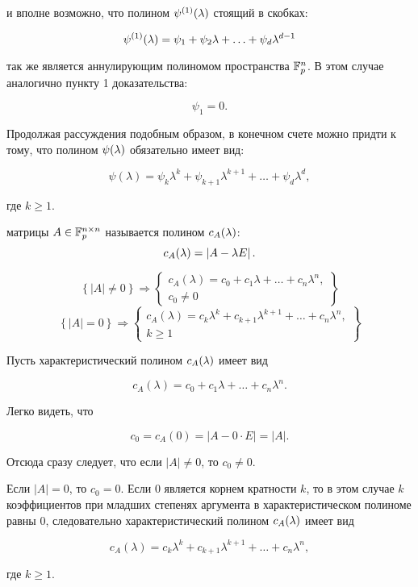 \begin{statement}
\begin{enumerate}
			и вполне возможно, что полином $\psi^{(1)} (\lambda)$ стоящий в скобках:

				$$ \psi^{(1)} (\lambda) = \psi_1 + \psi_2\lambda + \ldots + \psi_d\lambda^{d-1} $$

			так же является аннулирующим полиномом пространства $\mathbb{F}^{n}_p$. В этом случае аналогично пункту 1 доказательства:

				$$ \psi_1 = 0. $$

			Продолжая рассуждения подобным образом, в конечном счете можно придти к тому, что полином $\psi (\lambda)$ обязательно
			имеет вид:

				$$ \psi(\lambda) = \psi_k \lambda^k + \psi_{k+1} \lambda^{k+1} + \dots + \psi_d \lambda^{d}, $$

			где $k \ge 1$.

	\end{enumerate}
\end{statement}

\begin{definition}
	 матрицы $A \in \mathbb{F}^{n \times n}_p$ называется полином $c_A (\lambda)$:
	$$ c_A (\lambda) = \left | A - \lambda E \right |. $$
\end{definition}

\begin{statement} \label{statement:APD:determinant_and_characteristic_polynomial}
		$$
			\left \{
				\left | A \right | \neq 0
			\right \}
			\Rightarrow
			\left \{
				\begin{array}{c}
					c_A(\lambda) = c_0 + c_1 \lambda + \dots + c_n \lambda^n,\\
					c_0 \neq 0
				\end{array}
			\right \}
		$$
		$$
			\left \{
				\left | A \right | = 0
			\right \}
			\Rightarrow
			\left \{
				\begin{array}{c}
					c_A(\lambda) = c_k \lambda^k + c_{k+1} \lambda^{k+1} + \dots + c_n \lambda^n,\\
					k \ge 1
				\end{array}
			\right \}
		$$

	\proof

	Пусть характеристический полином $c_A (\lambda)$ имеет вид

		$$c_A(\lambda) = c_0 + c_1 \lambda + \dots + c_n \lambda^n. $$

	Легко видеть, что

		$$ c_0 = c_A ( 0 ) = \left | A - 0 \cdot E \right | = \left | A \right |.$$

	Отсюда сразу следует, что если $\left | A \right | \neq 0$, то $c_0 \neq 0$.

	Если $\left | A \right | = 0$, то $c_0 = 0$. Если $0$ является корнем кратности $k$, то в этом случае $k$ коэффициентов при младших
	степенях аргумента в характеристическом полиноме равны $0$,	следовательно характеристический полином $c_A (\lambda)$ имеет вид

		$$ c_A(\lambda) = c_k \lambda^k + c_{k+1} \lambda^{k+1} + \dots + c_n \lambda^n, $$

	где $k \ge 1$.

\end{statement}

